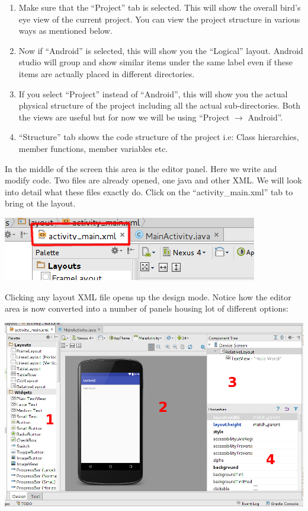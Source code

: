\begin{enumerate}
	\item Make sure that the ``Project'' tab is selected. This will show the overall bird's eye view of the current project. You can view the project structure in various ways as mentioned below.
	\item Now if ``Android'' is selected, this will show you the ``Logical'' layout. Android studio will group and show similar items under the same label even if these items are actually placed in different directories.
	\item If you select ``Project'' instead of ``Android'', this will show you the actual physical structure of the project including all the actual sub-directories. Both the views are useful but for now we will be using ``Project $\rightarrow$ Android''.
	\item ``Structure'' tab shows the code structure of the project i.e: Class hierarchies, member functions, member variables etc.
\end{enumerate}

In the middle of the screen this area is the editor panel. Here we write and modify code. Two files are already opened, one java and other XML. We will look into detail what these files exactly do. Click on the ``activity\_main.xml'' tab to bring ot the layout.

\begin{center}
	\includegraphics[scale=0.4]{chapters/ch02/images/7_editor}
\end{center}

Clicking any layout XML file opens up the design mode. Notice how the editor area is now converted into a number of panels housing lot of different options:

\begin{center}
	\includegraphics[scale=0.3]{chapters/ch02/images/8_design}
\end{center}

